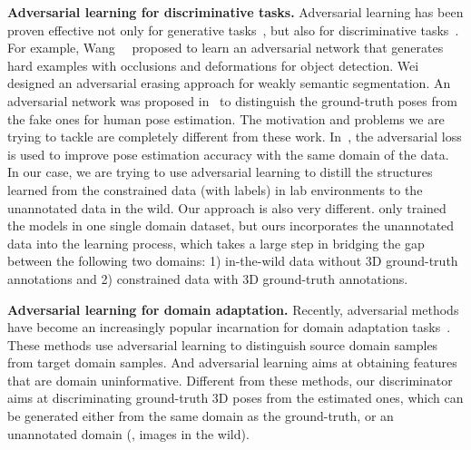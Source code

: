 \documentclass[10pt,twocolumn,letterpaper]{article}
\newcommand{\smalltitle}[1]{\vspace{0.2em}\noindent \textbf{{#1}}}
\begin{document}
\smalltitle{Adversarial learning for discriminative tasks. } 
Adversarial learning has been proven effective not only for generative tasks~\cite{goodfellow2014generative,radford2015unsupervised,vondrick2016generating,zhu2017unpaired,WangECCV2016,denton2015deep,huang2017stacked,zhang2016stackgan,karras2017progressive,isola2017image,villegas2017learning,liang2017recurrent}, but also for discriminative tasks~\cite{wang2017fast,wei2017object,chen2017adversarial, chen2017adversarial2,Sohn17}. 
For example, Wang~\etal~\cite{wang2017fast} proposed to learn an adversarial network that generates hard examples with occlusions and deformations for object detection. 
Wei~\etal~\cite{wei2017object} designed an adversarial erasing approach for weakly semantic segmentation. 
An adversarial network was proposed in~\cite{chen2017adversarial, chen2017adversarial2} to distinguish the ground-truth poses from the fake ones for human pose estimation. 
The motivation and problems we are trying to tackle are completely different from these work. 
In~\cite{chen2017adversarial, chen2017adversarial2}, the adversarial loss is used to improve pose estimation accuracy with the same domain of the data. In our case, we are trying to use adversarial learning to distill the structures learned from the constrained data (with labels) in lab environments to the unannotated data in the wild. 
Our approach is also very different. \cite{chen2017adversarial, chen2017adversarial2} only trained the models in one single domain dataset, but ours incorporates the unannotated data into the learning process, which takes a large step in bridging the gap between the following two domains: 1) in-the-wild data without 3D ground-truth annotations and 2) constrained  data with 3D ground-truth annotations. 



\smalltitle{Adversarial learning for domain adaptation. }
Recently, adversarial methods have become an increasingly popular incarnation for domain adaptation tasks~\cite{ganin2015unsupervised,tzeng2015simultaneous,liu2016coupled,tzeng2017adversarial,hoffman2017cycada}. 
These methods use adversarial learning to distinguish source domain samples from target domain samples. 
And adversarial learning aims at obtaining features that are domain uninformative. 
Different from these methods, our discriminator aims at discriminating ground-truth 3D poses from the estimated ones, which can be generated either from the same domain as the ground-truth, or an unannotated domain (\eg, images in the wild). 
\end{document}
